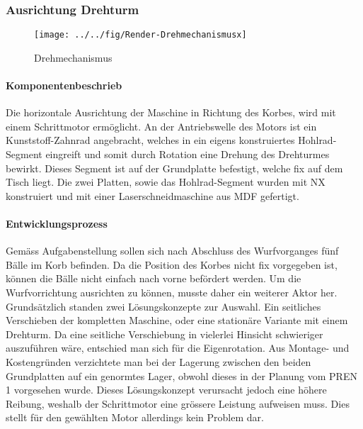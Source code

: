 \subsubsection{Ausrichtung Drehturm}
\begin{figure}[h!]
	\centering
		\texttt{[image: ../../fig/Render-Drehmechanismusx]}
	\caption{Drehmechanismus}
	\label{fig:Drehmechanismus}
\end{figure}
\paragraph{Komponentenbeschrieb}
Die horizontale Ausrichtung der Maschine in Richtung des Korbes, wird mit einem Schrittmotor ermöglicht. An der Antriebswelle des Motors ist ein Kunststoff-Zahnrad angebracht, welches in ein eigens konstruiertes Hohlrad-Segment eingreift und somit durch Rotation eine Drehung des Drehturmes bewirkt. Dieses Segment ist auf der Grundplatte befestigt, welche fix auf dem Tisch liegt. Die zwei Platten, sowie das Hohlrad-Segment wurden mit NX konstruiert und mit einer Laserschneidmaschine aus MDF gefertigt.

\paragraph{Entwicklungsprozess}
Gemäss Aufgabenstellung sollen sich nach Abschluss des Wurfvorganges fünf Bälle im Korb befinden. Da die Position des Korbes nicht fix vorgegeben ist, können die Bälle nicht einfach nach vorne befördert werden. Um die Wurfvorrichtung ausrichten zu können, musste daher ein weiterer Aktor her. Grundsätzlich standen zwei Lösungskonzepte zur Auswahl. Ein seitliches Verschieben der kompletten Maschine, oder eine stationäre Variante mit einem Drehturm. Da eine seitliche Verschiebung in vielerlei Hinsicht schwieriger auszuführen wäre, entschied man sich für die Eigenrotation. Aus Montage- und Kostengründen verzichtete man bei der Lagerung zwischen den beiden Grundplatten auf ein genormtes Lager, obwohl dieses in der Planung vom PREN 1 vorgesehen wurde. Dieses Lösungskonzept verursacht jedoch eine höhere Reibung, weshalb der Schrittmotor eine grössere Leistung aufweisen muss. Dies stellt für den gewählten Motor allerdings kein Problem dar.